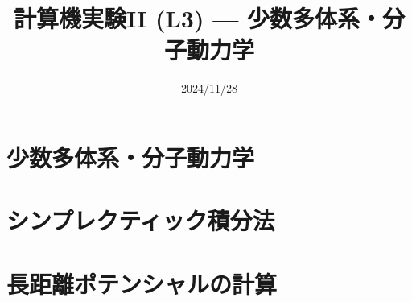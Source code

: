 \documentclass[10pt,dvipdfmx]{beamer}
\title{計算機実験II (L3) --- 少数多体系・分子動力学}
\date{2024/11/28}
\begin{document}
\begin{frame}
  \titlepage
  \tableofcontents
\end{frame}

\section{少数多体系・分子動力学}




%

%




\section{シンプレクティック積分法}
















%
%

\section{長距離ポテンシャルの計算}
\end{document}
